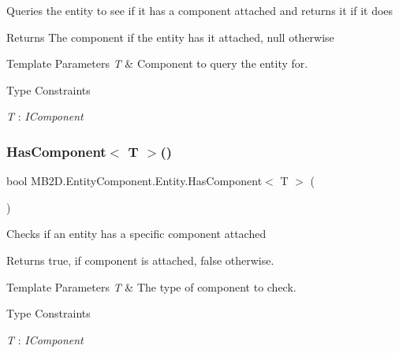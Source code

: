 Queries the entity to see if it has a component attached and returns it if it does 

\begin{DoxyReturn}{Returns}
The component if the entity has it attached, null otherwise
\end{DoxyReturn}

\begin{DoxyTemplParams}{Template Parameters}
{\em T} & Component to query the entity for.\\
\hline
\end{DoxyTemplParams}
\begin{Desc}
\item[Type Constraints]\begin{description}
\item[{\em T} : {\em I\+Component}]\end{description}
\end{Desc}
\hypertarget{class_m_b2_d_1_1_entity_component_1_1_entity_a8bbe196918b2eb4fe2102285c310ced3}{}\label{class_m_b2_d_1_1_entity_component_1_1_entity_a8bbe196918b2eb4fe2102285c310ced3} 
\subsubsection{\texorpdfstring{Has\+Component$<$ T $>$()}{HasComponent< T >()}}
{\footnotesize\ttfamily bool M\+B2\+D.\+Entity\+Component.\+Entity.\+Has\+Component$<$ T $>$ (\begin{DoxyParamCaption}{ }\end{DoxyParamCaption})\hspace{0.3cm}{\ttfamily [inline]}}



Checks if an entity has a specific component attached 

\begin{DoxyReturn}{Returns}
{\ttfamily true}, if component is attached, {\ttfamily false} otherwise.
\end{DoxyReturn}

\begin{DoxyTemplParams}{Template Parameters}
{\em T} & The type of component to check.\\
\hline
\end{DoxyTemplParams}
\begin{Desc}
\item[Type Constraints]\begin{description}
\item[{\em T} : {\em I\+Component}]\end{description}
\end{Desc}


